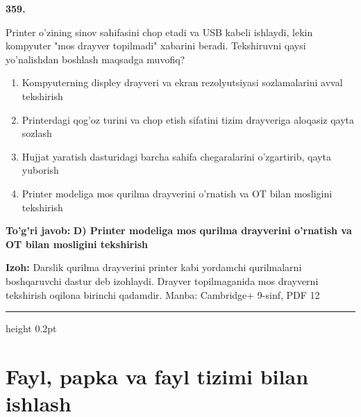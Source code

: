 \documentclass[10pt,a4paper]{article}
\begin{document}
{\bfseries\sffamily\color{ink} 359.}
\par
Printer o'zining sinov sahifasini chop etadi va USB kabeli ishlaydi, lekin kompyuter "mos drayver topilmadi" xabarini beradi. Tekshiruvni qaysi yo'nalishdan boshlash maqsadga muvofiq?
\begin{enumerate}[label=\Alph*),leftmargin=9mm]
\item Kompyuterning displey drayveri va ekran rezolyutsiyasi sozlamalarini avval tekshirish
\item Printerdagi qog'oz turini va chop etish sifatini tizim drayveriga aloqasiz qayta sozlash
\item Hujjat yaratish dasturidagi barcha sahifa chegaralarini o'zgartirib, qayta yuborish
\item Printer modeliga mos qurilma drayverini o'rnatish va OT bilan mosligini tekshirish
\end{enumerate}
\begin{tcolorbox}[enhanced,breakable,colback=teal!4,colframe=teal!60!black,boxrule=0.45pt,arc=1.2mm,left=2.7mm,right=2.7mm,top=1.8mm,bottom=1.8mm,before skip=2mm,after skip=2mm]
{\bfseries\sffamily\color{teal}To'g'ri javob:} \textbf{D) Printer modeliga mos qurilma drayverini o'rnatish va OT bilan mosligini tekshirish}
\par\smallskip
{\bfseries Izoh:} Darslik qurilma drayverini printer kabi yordamchi qurilmalarni boshqaruvchi dastur deb izohlaydi. Drayver topilmaganida mos drayverni tekshirish oqilona birinchi qadamdir. Manba: Cambridge+ 9-sinf, PDF 12
\end{tcolorbox}
\vspace{2mm}\hrule height 0.2pt\vspace{3mm}
\clearpage
\section{Fayl, papka va fayl tizimi bilan ishlash}
\end{document}
